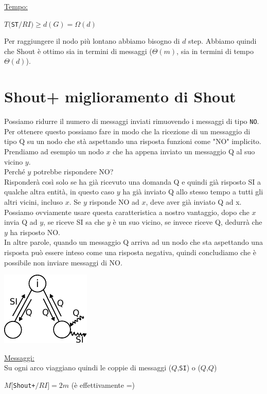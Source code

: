 \underline{Tempo:}
\begin{center}
    $T($\texttt{ST}$/RI) \geq d(G) = \Omega(d)$
\end{center}
Per raggiungere il nodo più lontano abbiamo bisogno di $d$ step. Abbiamo quindi
che Shout è ottimo sia in termini di messaggi ($\Theta(m)$, sia in termini di
tempo $\Theta(d)$).

\section{Shout+ miglioramento di Shout}
Possiamo ridurre il numero di messaggi inviati rimuovendo i messaggi di tipo
\texttt{NO}. Per ottenere questo possiamo fare in modo che la ricezione di un
messaggio di tipo Q su un nodo che stà aspettando una risposta funzioni come
"NO" implicito.\\
Prendiamo ad esempio un nodo $x$ che ha appena inviato un messaggio Q al suo
vicino $y$.\\ Perché $y$ potrebbe rispondere NO? \\Risponderà così solo se ha
già ricevuto una domanda Q e quindi già risposto SI a qualche altra entità, in
questo caso $y$ ha già inviato Q allo stesso tempo a tutti gli altri vicini,
incluso $x$. Se $y$ risponde NO ad $x$, deve aver già inviato Q ad x. Possiamo
ovviamente usare questa caratteristica a nostro vantaggio, dopo che $x$ invia Q
ad $y$, se riceve SI sa che $y$ è un suo vicino, se invece riceve Q, dedurrà che
$y$ ha risposto NO.\\
In altre parole, quando un messaggio Q arriva ad un nodo che sta aspettando una
risposta può essere inteso come una risposta negativa, quindi concludiamo che è
possibile non inviare messaggi di NO.
\begin{center}
    \includegraphics[scale=1.4]{images/n_23}
\end{center}
\underline{Messaggi:}\\
Su ogni arco viaggiano quindi le coppie di messaggi ($Q$,\texttt{SI}) o
($Q$,$Q$)

\begin{center}
    $M[$\texttt{Shout+}$/RI] = 2m$ (è effettivamente =)\\
\end{center}


